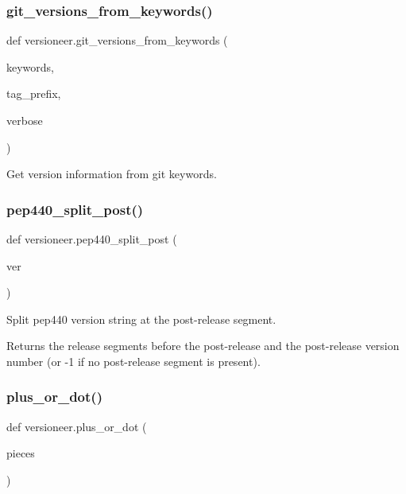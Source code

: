 \subsubsection{\texorpdfstring{git\+\_\+versions\+\_\+from\+\_\+keywords()}{git\_versions\_from\_keywords()}}
{\footnotesize\ttfamily def versioneer.\+git\+\_\+versions\+\_\+from\+\_\+keywords (\begin{DoxyParamCaption}\item[{}]{keywords,  }\item[{}]{tag\+\_\+prefix,  }\item[{}]{verbose }\end{DoxyParamCaption})}

\begin{DoxyVerb}Get version information from git keywords.\end{DoxyVerb}
 \mbox{\label{namespaceversioneer_a8e584b4246d09746940fe349e5251213}} 
\subsubsection{\texorpdfstring{pep440\+\_\+split\+\_\+post()}{pep440\_split\_post()}}
{\footnotesize\ttfamily def versioneer.\+pep440\+\_\+split\+\_\+post (\begin{DoxyParamCaption}\item[{}]{ver }\end{DoxyParamCaption})}

\begin{DoxyVerb}Split pep440 version string at the post-release segment.

Returns the release segments before the post-release and the
post-release version number (or -1 if no post-release segment is present).
\end{DoxyVerb}
 \mbox{\label{namespaceversioneer_ae3c26ab2721af61ccd87516c65d8923a}} 
\subsubsection{\texorpdfstring{plus\+\_\+or\+\_\+dot()}{plus\_or\_dot()}}
{\footnotesize\ttfamily def versioneer.\+plus\+\_\+or\+\_\+dot (\begin{DoxyParamCaption}\item[{}]{pieces }\end{DoxyParamCaption})}

